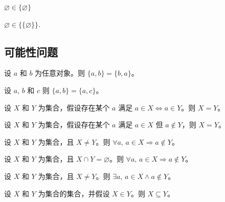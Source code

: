 \begin{chapex}
$\varnothing \in \{ \varnothing \}$
\end{chapex}

\begin{chapex}
\label{cqSetsTFEnd}
$\varnothing \in \{ \{ \varnothing \} \}$.
\end{chapex}

\subsection*{可能性问题}


\begin{chapex} %
\label{cqSetsASNBegin}
设 $a$ 和 $b$ 为任意对象。则 $\{ a, b \} = \{ b, a \}$。
\end{chapex}

\begin{chapex} %
设 $a$, $b$ 和 $c$ 则 $\{ a, b \} = \{ a, c \}$。
\end{chapex}

\begin{chapex} %
设 $X$ 和 $Y$ 为集合，假设存在某个 $a$ 满足 $a \in X \Leftrightarrow a \in Y$。则 $X = Y$。
\end{chapex}

\begin{chapex} %
设 $X$ 和 $Y$ 为集合，假设存在某个 $a$ 满足 $a \in X$ 但 $a \not\in Y$，则 $X = Y$。
\end{chapex}

\begin{chapex} %
设 $X$ 和 $Y$ 为集合，且 $X \ne Y$。则 $\forall a,\, a \in X \Rightarrow a \not\in Y$。
\end{chapex}

\begin{chapex} %
设 $X$ 和 $Y$ 为集合，且 $X \cap Y = \varnothing$。则 $\forall a,\, a \in X \Rightarrow a \not\in Y$。
\end{chapex}

\begin{chapex} %
设 $X$ 和 $Y$ 为集合，且 $X \ne Y$。则 $\exists a,\, a \in X \wedge a \not\in Y$。
\end{chapex}

\begin{chapex} %
设 $X$ 和 $Y$ 为集合的集合，并假设 $X \in Y$。则 $X \subseteq Y$。
\end{chapex}

